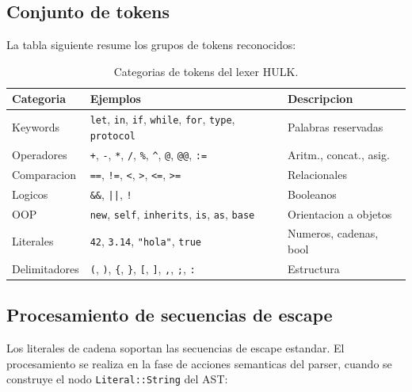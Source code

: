 \documentclass[12pt,a4paper]{article}
\begin{document}
\subsection{Conjunto de tokens}

La tabla siguiente resume los grupos de tokens reconocidos:

\begin{table}[H]
\centering
\begin{tabular}{lll}
\toprule
\textbf{Categoria} & \textbf{Ejemplos} & \textbf{Descripcion} \\
\midrule
Keywords    & \texttt{let}, \texttt{in}, \texttt{if}, \texttt{while},
              \texttt{for}, \texttt{type}, \texttt{protocol} & Palabras reservadas \\
Operadores  & \texttt{+}, \texttt{-}, \texttt{*}, \texttt{/}, \texttt{\%},
              \texttt{\^{}}, \texttt{@}, \texttt{@@}, \texttt{:=} & Aritm., concat., asig. \\
Comparacion & \texttt{==}, \texttt{!=}, \texttt{<}, \texttt{>},
              \texttt{<=}, \texttt{>=} & Relacionales \\
Logicos     & \texttt{\&\&}, \texttt{||}, \texttt{!} & Booleanos \\
OOP         & \texttt{new}, \texttt{self}, \texttt{inherits}, \texttt{is},
              \texttt{as}, \texttt{base} & Orientacion a objetos \\
Literales   & \texttt{42}, \texttt{3.14}, \texttt{"hola"}, \texttt{true} & Numeros, cadenas, bool \\
Delimitadores & \texttt{(}, \texttt{)}, \texttt{\{}, \texttt{\}},
                \texttt{[}, \texttt{]}, \texttt{,}, \texttt{;}, \texttt{:} & Estructura \\
\bottomrule
\end{tabular}
\caption{Categorias de tokens del lexer HULK.}
\end{table}

\subsection{Procesamiento de secuencias de escape}

Los literales de cadena soportan las secuencias de escape estandar. El procesamiento
se realiza en la fase de acciones semanticas del parser, cuando se construye el nodo
\texttt{Literal::String} del AST:
\end{document}
